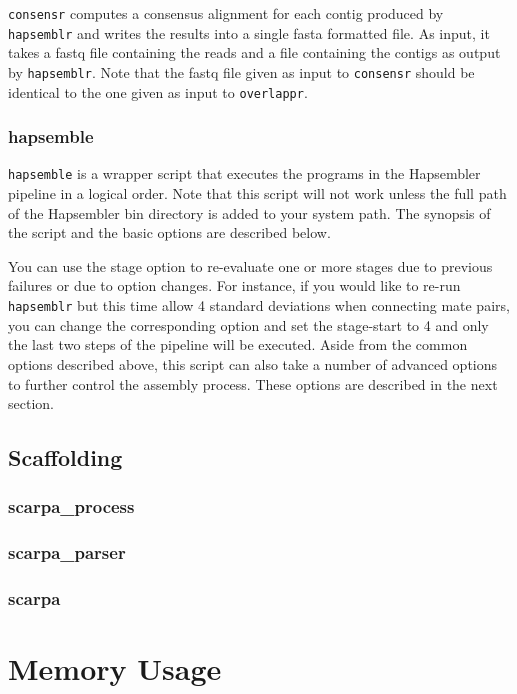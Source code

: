 \documentclass[12pt,a4paper]{report}
\begin{document}
\texttt{consensr} computes a consensus alignment for each contig produced by \texttt{hapsemblr} and writes the results into a single
fasta formatted file. As input, it takes a fastq file containing the reads and a file containing the contigs as output by
\texttt{hapsemblr}. Note that the fastq file given as input to \texttt{consensr} should be
identical to the one given as input to \texttt{overlappr}.

\subsubsection{hapsemble}
\label{hapscript}

\texttt{hapsemble} is a wrapper script that executes the programs in the Hapsembler pipeline in a logical order. Note that this script will not work unless the full path of the Hapsembler bin directory is added to your system path. The synopsis of the script and the basic options are described below.

You can use the stage option to re-evaluate one or more stages due to previous failures or due to option changes. For instance, if you would like to re-run \texttt{hapsemblr} but this time allow 4 standard deviations when connecting mate pairs, you can change the corresponding option and set the stage-start to 4 and only the last two steps of the pipeline will be executed. Aside from the common options described above, this script can also take a number of advanced options to further control the assembly process. These options are described in the next section.

\subsection{Scaffolding}

\subsubsection{scarpa\_process}

\subsubsection{scarpa\_parser}

\subsubsection{scarpa}

\section{Memory Usage}
\end{document}
